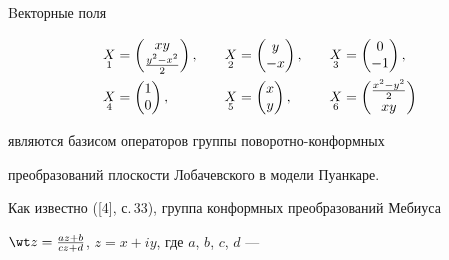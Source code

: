 Bекторные поля


\begin{alignat*}{3} 


\down{1}{X}&= \begin{pmatrix} 


x y \\ \frac{y^2-x^2}{2} 


\end{pmatrix} 


, &\quad \down{2}{X}&=\begin{pmatrix} 


y \\ -x 


\end{pmatrix} 


, &\quad \down{3}{X}&=\begin{pmatrix} 


0 \\ -1 


\end{pmatrix} 


, \\ 


% 


\down{4}{X}&=\begin{pmatrix} 


1 \\ 0 


\end{pmatrix} 


, &\quad \down{5}{X}&=\begin{pmatrix} 


x \\ y 


\end{pmatrix} 


, &\quad \down{6}{X}&=\begin{pmatrix} 


\frac{x^2-y^2}{2} \\ x y 


\end{pmatrix} 


\end{alignat*} 


являются базисом операторов группы поворотно-конформных 


преобразований плоскости Лобачевского в модели Пуанкаре. 


Как известно ([4], с.\,33), группа конформных преобразований Мебиуса 


$\wt z=\frac{az+b}{cz+d}$, $z=x+iy$, где $a$, $b$, $c$, $d$ --- 



